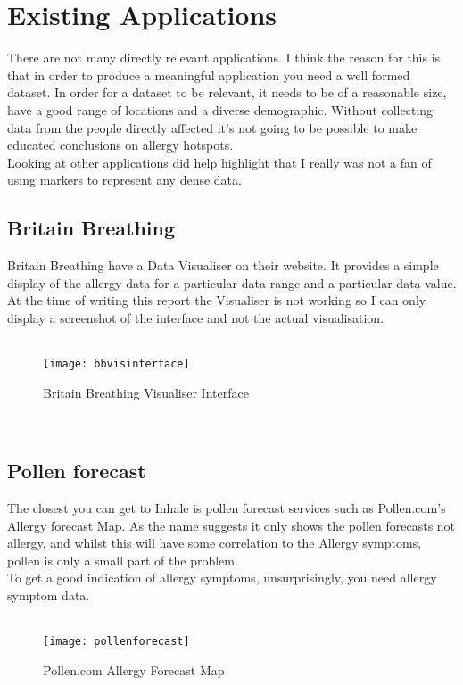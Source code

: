 \section{Existing Applications}
\label{sec:diagrams}

There are not many directly relevant applications. I think the reason for this is that in order to produce a meaningful application you need a well formed dataset. In order for a dataset to be relevant, it needs to be of a reasonable size, have a good range of locations and a diverse demographic. Without collecting data from the people directly affected it's not going to be possible to make educated conclusions on allergy hotspots.\\

Looking at other applications did help highlight that I really was not a fan of using markers to represent any dense data.



\subsection{Britain Breathing}
Britain Breathing have a Data Visualiser on their website. It provides a simple display of the allergy data for a particular data range and a particular data value. At the time of writing this report the Visualiser is not working so I can only display a screenshot of the interface and not the actual visualisation.

\begin{SCfigure}
\caption{Britain Breathing Visualiser Interface}\\
\centering
\texttt{[image: bbvisinterface]}
\centering
\end{SCfigure}\\

\subsection{Pollen forecast}

The closest you can get to Inhale is pollen forecast services such as Pollen.com's Allergy forecast Map. As the name suggests it only shows the pollen forecasts not allergy, and whilst this will have some correlation to the Allergy symptoms, pollen is only a small part of the problem.\\

To get a good indication of allergy symptoms, unsurprisingly, you need allergy symptom data.\\

\begin{SCfigure}
\caption{Pollen.com Allergy Forecast Map}\\
\centering
\texttt{[image: pollenforecast]}
\centering
\end{SCfigure}\\

